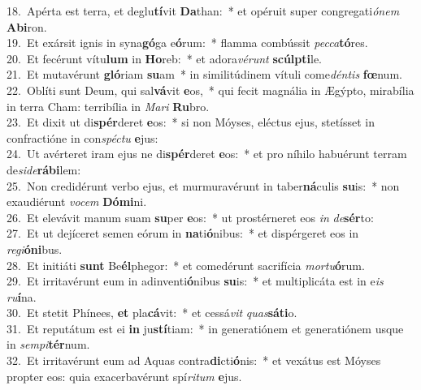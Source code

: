 {18.~}Apérta est terra, et deglu\textbf{tí}vit \textbf{Da}than:~* et opéruit super congregati\textit{ó}\textit{nem} \textbf{A}\textbf{bi}ron.\\
{19.~}Et exársit ignis in syna\textbf{gó}ga e\textbf{ó}rum:~* flamma combússit \textit{pec}\textit{ca}\textbf{tó}res.\\
{20.~}Et fecérunt vítu\textbf{lum} in \textbf{Ho}reb:~* et adora\textit{vé}\textit{runt} \textbf{scúl}\textbf{pti}le.\\
{21.~}Et mutavérunt \textbf{gló}riam \textbf{su}am~* in similitúdinem vítuli come\textit{dén}\textit{tis} \textbf{fœ}num.\\
{22.~}Oblíti sunt Deum, qui sal\textbf{vá}vit \textbf{e}os,~* qui fecit magnália in Ægýpto, mirabília in terra Cham: terribília in \textit{Ma}\textit{ri} \textbf{Ru}bro.\\
{23.~}Et dixit ut di\textbf{spér}deret \textbf{e}os:~* si non Móyses, eléctus ejus, stetísset in confractióne in con\textit{spé}\textit{ctu} \textbf{e}jus:\\
{24.~}Ut avérteret iram ejus ne di\textbf{spér}deret \textbf{e}os:~* et pro níhilo habuérunt terram de\textit{si}\textit{de}\textbf{rá}\textbf{bi}lem:\\
{25.~}Non credidérunt verbo ejus, et murmuravérunt in taber\textbf{ná}culis \textbf{su}is:~* non exaudiérunt \textit{vo}\textit{cem} \textbf{Dó}\textbf{mi}ni.\\
{26.~}Et elevávit manum suam \textbf{su}per \textbf{e}os:~* ut prostérneret eos \textit{in} \textit{de}\textbf{sér}to:\\
{27.~}Et ut dejíceret semen eórum in \textbf{na}ti\textbf{ó}nibus:~* et dispérgeret eos in \textit{re}\textit{gi}\textbf{ó}\textbf{ni}bus.\\
{28.~}Et initiáti \textbf{sunt} Be\textbf{él}phegor:~* et comedérunt sacrifícia \textit{mor}\textit{tu}\textbf{ó}rum.\\
{29.~}Et irritavérunt eum in adinventi\textbf{ó}nibus \textbf{su}is:~* et multiplicáta est in e\textit{is} \textit{ru}\textbf{í}na.\\
{30.~}Et stetit Phínees, \textbf{et} pla\textbf{cá}vit:~* et cessá\textit{vit} \textit{quas}\textbf{sá}\textbf{ti}o.\\
{31.~}Et reputátum est ei \textbf{in} ju\textbf{stí}tiam:~* in generatiónem et generatiónem usque in \textit{sem}\textit{pi}\textbf{tér}num.\\
{32.~}Et irritavérunt eum ad Aquas contra\textbf{di}cti\textbf{ó}nis:~* et vexátus est Móyses propter eos: quia exacerbavérunt spí\textit{ri}\textit{tum} \textbf{e}jus.\\
